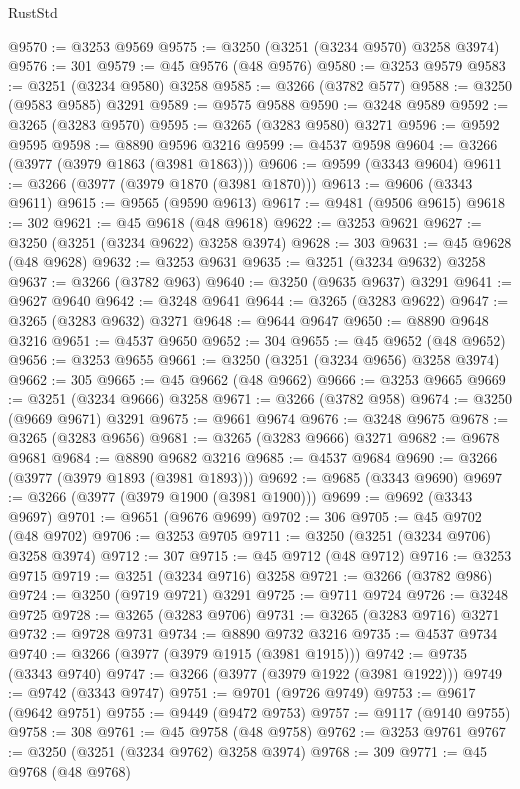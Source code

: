 \begin{lexlean}{RustStd}
\begin{coremodule}
@9570 := @3253 @9569
@9575 := @3250 (@3251 (@3234 @9570) @3258 @3974)
@9576 := 301
@9579 := @45 @9576 (@48 @9576)
@9580 := @3253 @9579
@9583 := @3251 (@3234 @9580) @3258
@9585 := @3266 (@3782 @577)
@9588 := @3250 (@9583 @9585) @3291
@9589 := @9575 @9588
@9590 := @3248 @9589
@9592 := @3265 (@3283 @9570)
@9595 := @3265 (@3283 @9580) @3271
@9596 := @9592 @9595
@9598 := @8890 @9596 @3216
@9599 := @4537 @9598
@9604 := @3266 (@3977 (@3979 @1863 (@3981 @1863)))
@9606 := @9599 (@3343 @9604)
@9611 := @3266 (@3977 (@3979 @1870 (@3981 @1870)))
@9613 := @9606 (@3343 @9611)
@9615 := @9565 (@9590 @9613)
@9617 := @9481 (@9506 @9615)
@9618 := 302
@9621 := @45 @9618 (@48 @9618)
@9622 := @3253 @9621
@9627 := @3250 (@3251 (@3234 @9622) @3258 @3974)
@9628 := 303
@9631 := @45 @9628 (@48 @9628)
@9632 := @3253 @9631
@9635 := @3251 (@3234 @9632) @3258
@9637 := @3266 (@3782 @963)
@9640 := @3250 (@9635 @9637) @3291
@9641 := @9627 @9640
@9642 := @3248 @9641
@9644 := @3265 (@3283 @9622)
@9647 := @3265 (@3283 @9632) @3271
@9648 := @9644 @9647
@9650 := @8890 @9648 @3216
@9651 := @4537 @9650
@9652 := 304
@9655 := @45 @9652 (@48 @9652)
@9656 := @3253 @9655
@9661 := @3250 (@3251 (@3234 @9656) @3258 @3974)
@9662 := 305
@9665 := @45 @9662 (@48 @9662)
@9666 := @3253 @9665
@9669 := @3251 (@3234 @9666) @3258
@9671 := @3266 (@3782 @958)
@9674 := @3250 (@9669 @9671) @3291
@9675 := @9661 @9674
@9676 := @3248 @9675
@9678 := @3265 (@3283 @9656)
@9681 := @3265 (@3283 @9666) @3271
@9682 := @9678 @9681
@9684 := @8890 @9682 @3216
@9685 := @4537 @9684
@9690 := @3266 (@3977 (@3979 @1893 (@3981 @1893)))
@9692 := @9685 (@3343 @9690)
@9697 := @3266 (@3977 (@3979 @1900 (@3981 @1900)))
@9699 := @9692 (@3343 @9697)
@9701 := @9651 (@9676 @9699)
@9702 := 306
@9705 := @45 @9702 (@48 @9702)
@9706 := @3253 @9705
@9711 := @3250 (@3251 (@3234 @9706) @3258 @3974)
@9712 := 307
@9715 := @45 @9712 (@48 @9712)
@9716 := @3253 @9715
@9719 := @3251 (@3234 @9716) @3258
@9721 := @3266 (@3782 @986)
@9724 := @3250 (@9719 @9721) @3291
@9725 := @9711 @9724
@9726 := @3248 @9725
@9728 := @3265 (@3283 @9706)
@9731 := @3265 (@3283 @9716) @3271
@9732 := @9728 @9731
@9734 := @8890 @9732 @3216
@9735 := @4537 @9734
@9740 := @3266 (@3977 (@3979 @1915 (@3981 @1915)))
@9742 := @9735 (@3343 @9740)
@9747 := @3266 (@3977 (@3979 @1922 (@3981 @1922)))
@9749 := @9742 (@3343 @9747)
@9751 := @9701 (@9726 @9749)
@9753 := @9617 (@9642 @9751)
@9755 := @9449 (@9472 @9753)
@9757 := @9117 (@9140 @9755)
@9758 := 308
@9761 := @45 @9758 (@48 @9758)
@9762 := @3253 @9761
@9767 := @3250 (@3251 (@3234 @9762) @3258 @3974)
@9768 := 309
@9771 := @45 @9768 (@48 @9768)

\end{coremodule}
\end{lexlean}
